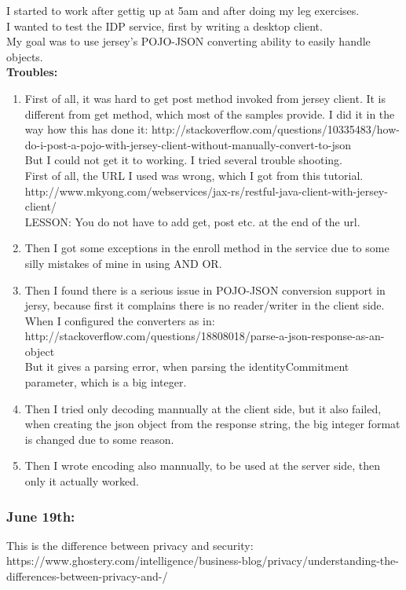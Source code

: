 \documentclass[11pt]{article}
\begin{document}
I started to work after gettig up at 5am and after doing my leg exercises.\\
I wanted to test the IDP service, first by writing a desktop client.\\
My goal was to use jersey's POJO-JSON converting ability to easily handle objects.\\
\textbf{Troubles:}
\begin{enumerate}
 \item First of all, it was hard to get post method invoked from jersey client. It is different from get method, which most of the samples provide.
 I did it in the way how this has done it: 
http://stackoverflow.com/questions/10335483/how-do-i-post-a-pojo-with-jersey-client-without-manually-convert-to-json\\
But I could not get it to working. I tried several trouble shooting.\\
First of all, the URL I used was wrong, which I got from this tutorial. 
http://www.mkyong.com/webservices/jax-rs/restful-java-client-with-jersey-client/\\
LESSON: You do not have to add get, post etc. at the end of the url.
\item Then I got some exceptions in the enroll method in the service due to some silly mistakes of mine in using AND OR.
\item Then I found there is a serious issue in POJO-JSON conversion support in jersy, because first it complains there is no reader/writer in the 
client side. When I configured the converters as in: http://stackoverflow.com/questions/18808018/parse-a-json-response-as-an-object\\
But it gives a parsing error, when parsing the identityCommitment parameter, which is a big integer.
\item Then I tried only decoding mannually at the client side, but it also failed, when creating the json object from the response string, the big 
integer format is changed due to some reason.
\item Then I wrote encoding also mannually, to be used at the server side, then only it actually worked.
\end{enumerate}

\subsubsection*{June 19th:}
This is the difference between privacy and security: 
https://www.ghostery.com/intelligence/business-blog/privacy/understanding-the-differences-between-privacy-and-/
\end{document}

